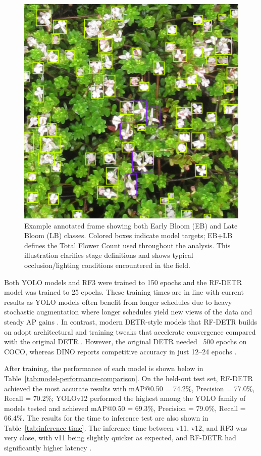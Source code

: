 \begin{figure}[H]
    \centering
    \includegraphics[width=0.5\linewidth]{images/Early and Late Bloom.png}
    \caption{Example annotated frame showing both Early Bloom (EB) and Late Bloom (LB) classes. Colored boxes indicate model targets; EB+LB defines the Total Flower Count used throughout the analysis. This illustration clarifies stage definitions and shows typical occlusion/lighting conditions encountered in the field.}
    \label{fig:early and late bloom}
\end{figure}

Both YOLO models and RF3 were trained to 150 epochs and the RF-DETR model was trained to 25 epochs. These training times are in line with current results as YOLO models often benefit from longer schedules due to heavy stochastic augmentation where longer schedules yield new views of the data and steady AP gains \cite{bochkovskiy_yolov4_2020}. In contrast, modern DETR-style models that RF-DETR builds on adopt architectural and training tweaks that accelerate convergence compared with the original DETR \cite{zhu_deformable_2021}. However, the original DETR needed ~500 epochs on COCO, whereas DINO reports competitive accuracy in just 12–24 epochs \cite{wang_rt-detrv3_2025}.

After training, the performance of each model is shown below in Table~\ref{tab:model-performance-comparison}. On the held-out test set, RF-DETR achieved the most accurate results with mAP@0.50 = 74.2\%, Precision = 77.0\%, Recall = 70.2\%; YOLOv12 performed the highest among the YOLO family of models tested and achieved mAP@0.50 = 69.3\%, Precision = 79.0\%, Recall = 66.4\%. The results for the time to inference test are also shown in Table~\ref{tab:inference time}. The inference time between v11, v12, and RF3 was very close, with v11 being slightly quicker as expected, and RF-DETR had significantly higher latency \cite{gonzalez_hernandez_analysis_2025}\cite{saltik_comparative_2025}.  

